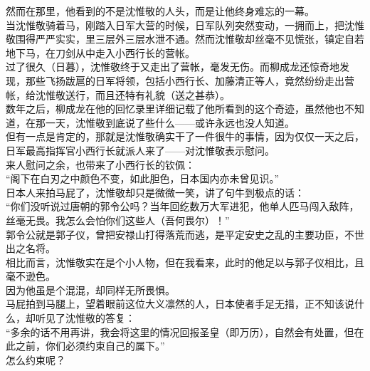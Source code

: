 \begin{multicols}{\theparacolNo}
然而在那里，他看到的不是沈惟敬的人头，而是让他终身难忘的一幕。\\

当沈惟敬骑着马，刚踏入日军大营的时候，日军队列突然变动，一拥而上，把沈惟敬围得严严实实，里三层外三层水泄不通。然而沈惟敬却丝毫不见慌张，镇定自若地下马，在刀剑从中走入小西行长的营帐。\\

过了很久（日暮），沈惟敬终于又走出了营帐，毫发无伤。而柳成龙还惊奇地发现，那些飞扬跋扈的日军将领，包括小西行长、加藤清正等人，竟然纷纷走出营帐，给沈惟敬送行，而且还特有礼貌（送之甚恭）。\\

数年之后，柳成龙在他的回忆录里详细记载了他所看到的这个奇迹，虽然他也不知道，在那一天，沈惟敬到底说了些什么——或许永远也没人知道。\\

但有一点是肯定的，那就是沈惟敬确实干了一件很牛的事情，因为仅仅一天之后，日军最高指挥官小西行长就派人来了——对沈惟敬表示慰问。\\

来人慰问之余，也带来了小西行长的钦佩：\\

“阁下在白刃之中颜色不变，如此胆色，日本国内亦未曾见识。”\\

日本人来拍马屁了，沈惟敬却只是微微一笑，讲了句牛到极点的话：\\

“你们没听说过唐朝的郭令公吗？当年回纥数万大军进犯，他单人匹马闯入敌阵，丝毫无畏。我怎么会怕你们这些人（吾何畏尔）！”\\

郭令公就是郭子仪，曾把安禄山打得落荒而逃，是平定安史之乱的主要功臣，不世出之名将。\\

相比而言，沈惟敬实在是个小人物，但在我看来，此时的他足以与郭子仪相比，且毫不逊色。\\

因为他虽是个混混，却同样无所畏惧。\\

马屁拍到马腿上，望着眼前这位大义凛然的人，日本使者手足无措，正不知该说什么，却听见了沈惟敬的答复：\\

“多余的话不用再讲，我会将这里的情况回报圣皇（即万历），自然会有处置，但在此之前，你们必须约束自己的属下。”\\

怎么约束呢？\\


\end{multicols}
